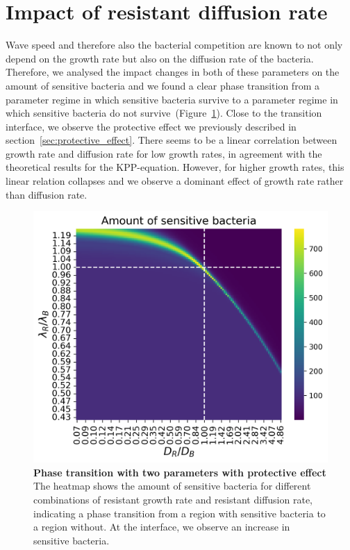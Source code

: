 \section{Impact of resistant diffusion rate}
Wave speed and therefore also the bacterial competition are known to not only depend on the growth rate but also on the diffusion rate of the bacteria. Therefore, we analysed the impact changes in both of these parameters on the amount of sensitive bacteria and we found a clear phase transition from a parameter regime in which sensitive bacteria survive to a parameter regime in which sensitive bacteria do not survive~(Figure~\ref{fig:results_heatmap_effect}). Close to the transition interface, we observe the protective effect we previously described in section~\ref{sec:protective_effect}. There seems to be a linear correlation between growth rate and diffusion rate for low growth rates, in agreement with the theoretical results for the KPP-equation. However, for higher growth rates, this linear relation collapses and we observe a dominant effect of growth rate rather than diffusion rate.
\begin{figure}
\centering
\includegraphics[width=\linewidth]{graphics/2025_09_26_phages_fig5.png}
\caption{\textbf{Phase transition with two parameters with protective effect} The heatmap shows the amount of sensitive bacteria for different combinations of resistant growth rate and resistant diffusion rate, indicating a phase transition from a region with sensitive bacteria to a region without. At the interface, we observe an increase in sensitive bacteria.}
\label{fig:results_heatmap_effect}
\end{figure}

